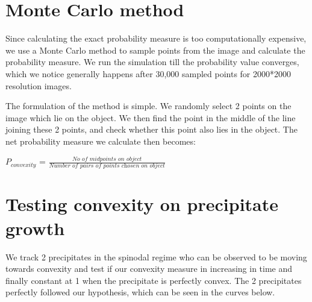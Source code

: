 \documentclass[12pt, a4paper]{report}
\begin{document}
\section{Monte Carlo method}
Since calculating the exact probability measure is too computationally expensive, we use a Monte Carlo method to sample points from the image and calculate the probability measure. We run the simulation till the probability value converges, which we notice generally happens after 30,000 sampled points for 2000*2000 resolution images.

The formulation of the method is simple. We randomly select 2 points on the image which lie on the object. We then find the point in the middle of the line joining these 2 points, and check whether this point also lies in the object. The net probability measure we calculate then becomes:

$P_{convexity}$ = $\frac{\textit{No of midpoints on object}}{\textit{Number of pairs of points chosen on object}}$


\section{Testing convexity on precipitate growth}
We track 2 precipitates in the spinodal regime who can be observed to be moving towards convexity and test if our convexity measure in increasing in time and finally constant at 1 when the precipitate is perfectly convex. The 2 precipitates perfectly followed our hypothesis, which can be seen in the curves below. 
\end{document}
